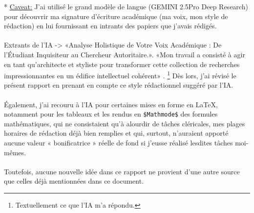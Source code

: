 * \underline{Caveat:} J'ai utilisé le grand modèle de langue (GEMINI 2.5Pro Deep Research) pour découvrir ma signature d'écriture académique (ma voix, mon style de rédaction) en lui fournissant en intrants des papiers que j'avais rédigés. \\
\\
Extrants de l'IA ->  «Analyse Holistique de Votre Voix Académique : De l'Étudiant Inquisiteur au Chercheur Autoritaire.». «Mon travail a consisté à agir en tant qu'architecte et styliste pour transformer cette collection de recherches impressionnantes en un édifice intellectuel cohérent» .  \footnote{Textuellement ce que l'IA m'a répondu.} Dès lors, j'ai révisé le présent rapport en prenant en compte ce style rédactionnel suggéré par l'IA. \\
\\
Également, j'ai recouru à l'IA pour certaines mises en forme en \LaTeX, notamment pour les tableaux et les rendus en \texttt{\$Mathmode\$} des formules mathématiques, qui ne consistaient qu'à alourdir de tâches cléricales, mes plages horaires de rédaction déjà bien remplies et qui, surtout, n'auraient apporté aucune valeur « bonificatrice » réelle de fond si j'eusse réalisé lesdites tâches moi-mêmes. \\
\\
Toutefois, aucune nouvelle idée dans ce rapport ne provient d'une autre source que celles déjà mentionnées dans ce document.

